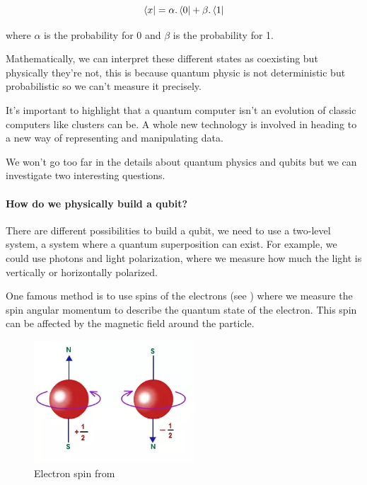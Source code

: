 \begin{equation}
  \bra{x} = \alpha . \bra{0} + \beta . \bra{1}
\end{equation}
\medskip

where $\alpha$ is the probability for 0 and $\beta$ is the probability for 1. \newline

Mathematically, we can interpret these different states as coexisting but physically they're not, this is because quantum physic is not deterministic but probabilistic so we can't measure it precisely. \newline

It's important to highlight that a quantum computer isn't an evolution of classic computers like clusters can be. A whole new technology is involved in heading to a new way of representing and manipulating data. \newline

We won't go too far in the details about quantum physics and qubits but we can investigate two interesting questions. \newline

\paragraph{How do we physically build a qubit?}

There are different possibilities to build a qubit, we need to use a two-level system, a system where a quantum superposition can exist. For example, we could use photons and light polarization, where we measure how much the light is vertically or horizontally polarized. \newline

One famous method is to use spins of the electrons (see \cite{spinWiki}) where we measure the spin angular momentum to describe the quantum state of the electron. This spin can be affected by the magnetic field around the particle. \newline

\begin{figure}[ht]
\centering
\includegraphics[width=6cm]{Figures/electronSpin}
\caption{Electron spin from \cite{spinNumber}}
\end{figure}
\medskip

